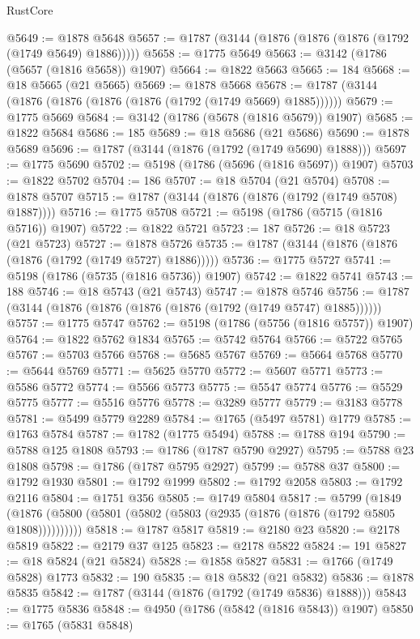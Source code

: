 \begin{lexlean}{RustCore}
\begin{coremodule}
@5649 := @1878 @5648
@5657 := @1787 (@3144 (@1876 (@1876 (@1876 (@1792 (@1749 @5649) @1886)))))
@5658 := @1775 @5649
@5663 := @3142 (@1786 (@5657 (@1816 @5658)) @1907)
@5664 := @1822 @5663
@5665 := 184
@5668 := @18 @5665 (@21 @5665)
@5669 := @1878 @5668
@5678 := @1787 (@3144 (@1876 (@1876 (@1876 (@1876 (@1792 (@1749 @5669) @1885))))))
@5679 := @1775 @5669
@5684 := @3142 (@1786 (@5678 (@1816 @5679)) @1907)
@5685 := @1822 @5684
@5686 := 185
@5689 := @18 @5686 (@21 @5686)
@5690 := @1878 @5689
@5696 := @1787 (@3144 (@1876 (@1792 (@1749 @5690) @1888)))
@5697 := @1775 @5690
@5702 := @5198 (@1786 (@5696 (@1816 @5697)) @1907)
@5703 := @1822 @5702
@5704 := 186
@5707 := @18 @5704 (@21 @5704)
@5708 := @1878 @5707
@5715 := @1787 (@3144 (@1876 (@1876 (@1792 (@1749 @5708) @1887))))
@5716 := @1775 @5708
@5721 := @5198 (@1786 (@5715 (@1816 @5716)) @1907)
@5722 := @1822 @5721
@5723 := 187
@5726 := @18 @5723 (@21 @5723)
@5727 := @1878 @5726
@5735 := @1787 (@3144 (@1876 (@1876 (@1876 (@1792 (@1749 @5727) @1886)))))
@5736 := @1775 @5727
@5741 := @5198 (@1786 (@5735 (@1816 @5736)) @1907)
@5742 := @1822 @5741
@5743 := 188
@5746 := @18 @5743 (@21 @5743)
@5747 := @1878 @5746
@5756 := @1787 (@3144 (@1876 (@1876 (@1876 (@1876 (@1792 (@1749 @5747) @1885))))))
@5757 := @1775 @5747
@5762 := @5198 (@1786 (@5756 (@1816 @5757)) @1907)
@5764 := @1822 @5762 @1834
@5765 := @5742 @5764
@5766 := @5722 @5765
@5767 := @5703 @5766
@5768 := @5685 @5767
@5769 := @5664 @5768
@5770 := @5644 @5769
@5771 := @5625 @5770
@5772 := @5607 @5771
@5773 := @5586 @5772
@5774 := @5566 @5773
@5775 := @5547 @5774
@5776 := @5529 @5775
@5777 := @5516 @5776
@5778 := @3289 @5777
@5779 := @3183 @5778
@5781 := @5499 @5779 @2289
@5784 := @1765 (@5497 @5781) @1779
@5785 := @1763 @5784
@5787 := @1782 (@1775 @5494)
@5788 := @1788 @194
@5790 := @5788 @125 @1808
@5793 := @1786 (@1787 @5790 @2927)
@5795 := @5788 @23 @1808
@5798 := @1786 (@1787 @5795 @2927)
@5799 := @5788 @37
@5800 := @1792 @1930
@5801 := @1792 @1999
@5802 := @1792 @2058
@5803 := @1792 @2116
@5804 := @1751 @356
@5805 := @1749 @5804
@5817 := @5799
    (@1849 (@1876 (@5800 (@5801 (@5802 (@5803 (@2935 (@1876 (@1876 (@1792 @5805 @1808))))))))))
@5818 := @1787 @5817
@5819 := @2180 @23
@5820 := @2178 @5819
@5822 := @2179 @37 @125
@5823 := @2178 @5822
@5824 := 191
@5827 := @18 @5824 (@21 @5824)
@5828 := @1858 @5827
@5831 := @1766 (@1749 @5828) @1773
@5832 := 190
@5835 := @18 @5832 (@21 @5832)
@5836 := @1878 @5835
@5842 := @1787 (@3144 (@1876 (@1792 (@1749 @5836) @1888)))
@5843 := @1775 @5836
@5848 := @4950 (@1786 (@5842 (@1816 @5843)) @1907)
@5850 := @1765 (@5831 @5848)

\end{coremodule}
\end{lexlean}
